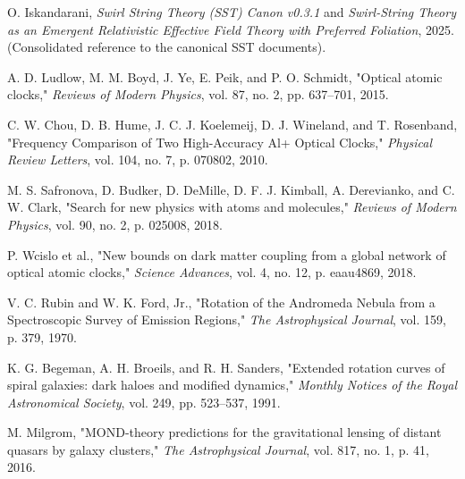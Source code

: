 \documentclass[11pt, a4paper]{article}
\begin{document}
        \begin{thebibliography}{9}

        O. Iskandarani, \textit{Swirl String Theory (SST) Canon v0.3.1} and \textit{Swirl-String Theory as an Emergent Relativistic Effective Field Theory with Preferred Foliation}, 2025. (Consolidated reference to the canonical SST documents).

        A. D. Ludlow, M. M. Boyd, J. Ye, E. Peik, and P. O. Schmidt, "Optical atomic clocks," \textit{Reviews of Modern Physics}, vol. 87, no. 2, pp. 637--701, 2015.

        C. W. Chou, D. B. Hume, J. C. J. Koelemeij, D. J. Wineland, and T. Rosenband, "Frequency Comparison of Two High-Accuracy Al+ Optical Clocks," \textit{Physical Review Letters}, vol. 104, no. 7, p. 070802, 2010.

        M. S. Safronova, D. Budker, D. DeMille, D. F. J. Kimball, A. Derevianko, and C. W. Clark, "Search for new physics with atoms and molecules," \textit{Reviews of Modern Physics}, vol. 90, no. 2, p. 025008, 2018.

        P. Wcislo et al., "New bounds on dark matter coupling from a global network of optical atomic clocks," \textit{Science Advances}, vol. 4, no. 12, p. eaau4869, 2018.

        V. C. Rubin and W. K. Ford, Jr., "Rotation of the Andromeda Nebula from a Spectroscopic Survey of Emission Regions," \textit{The Astrophysical Journal}, vol. 159, p. 379, 1970.

        K. G. Begeman, A. H. Broeils, and R. H. Sanders, "Extended rotation curves of spiral galaxies: dark haloes and modified dynamics," \textit{Monthly Notices of the Royal Astronomical Society}, vol. 249, pp. 523--537, 1991.

        M. Milgrom, "MOND-theory predictions for the gravitational lensing of distant quasars by galaxy clusters," \textit{The Astrophysical Journal}, vol. 817, no. 1, p. 41, 2016.

        \end{thebibliography}
\end{document}
